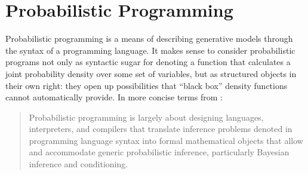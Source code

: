 \section{Probabilistic Programming}
\label{sec:prob-prog}

Probabilistic programming is a means of describing generative models through the syntax of a
programming language.  It makes sense to consider probabilistic programs not only as syntactic sugar
for denoting a function that calculates a joint probability density over some set of variables, but
as structured objects in their own right: they open up possibilities that \enquote{black box}
density functions cannot automatically provide. In more concise terms from
\textcite{vandemeent2018introduction}:
\begin{quote}
  Probabilistic programming is largely about designing languages, interpreters, and compilers that
  translate inference problems denoted in programming language syntax into formal mathematical
  objects that allow and accommodate generic probabilistic inference, particularly Bayesian
  inference and conditioning.
\end{quote}

